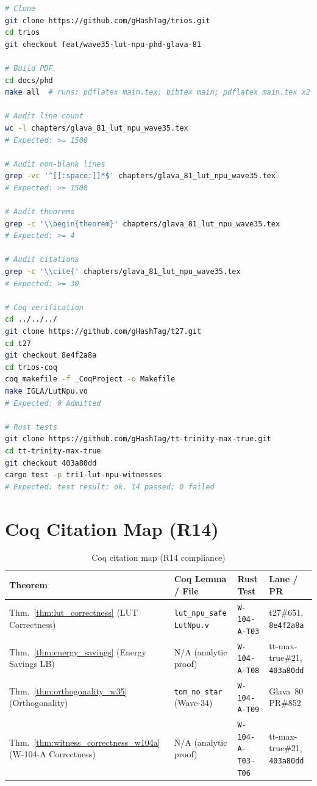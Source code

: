 \begin{lstlisting}[language=bash, caption={Reproducibility build commands for Glava 81}]
# Clone
git clone https://github.com/gHashTag/trios.git
cd trios
git checkout feat/wave35-lut-npu-phd-glava-81

# Build PDF
cd docs/phd
make all  # runs: pdflatex main.tex; bibtex main; pdflatex main.tex x2

# Audit line count
wc -l chapters/glava_81_lut_npu_wave35.tex
# Expected: >= 1500

# Audit non-blank lines
grep -vc '^[[:space:]]*$' chapters/glava_81_lut_npu_wave35.tex
# Expected: >= 1500

# Audit theorems
grep -c '\\begin{theorem}' chapters/glava_81_lut_npu_wave35.tex
# Expected: >= 4

# Audit citations
grep -c '\\cite{' chapters/glava_81_lut_npu_wave35.tex
# Expected: >= 30

# Coq verification
cd ../../../
git clone https://github.com/gHashTag/t27.git
cd t27
git checkout 8e4f2a8a
cd trios-coq
coq_makefile -f _CoqProject -o Makefile
make IGLA/LutNpu.vo
# Expected: 0 Admitted

# Rust tests
git clone https://github.com/gHashTag/tt-trinity-max-true.git
cd tt-trinity-max-true
git checkout 403a80dd
cargo test -p tri1-lut-npu-witnesses
# Expected: test result: ok. 14 passed; 0 failed
\end{lstlisting}

\section{Coq Citation Map (R14)}
\label{app:coq_citation_map}

\begin{table}[ht]
\centering
\caption{Coq citation map (R14 compliance)}
\label{tab:coq_citation_map}
\begin{tabular}{p{4cm}p{3cm}p{3cm}p{2.5cm}}
\hline
Theorem & Coq Lemma / File & Rust Test & Lane / PR \\
\hline
Thm.~\ref{thm:lut_correctness} (LUT Correctness) &
  \texttt{lut\_npu\_safe} \newline \texttt{LutNpu.v} &
  \texttt{W-104-A-T03} &
  t27\#651, \texttt{8e4f2a8a} \\
Thm.~\ref{thm:energy_savings} (Energy Savings LB) &
  N/A (analytic proof) &
  \texttt{W-104-A-T08} &
  tt-max-true\#21, \texttt{403a80dd} \\
Thm.~\ref{thm:orthogonality_w35} (Orthogonality) &
  \texttt{tom\_no\_star} (Wave-34) &
  \texttt{W-104-A-T09} &
  Glava~80 PR\#852 \\
Thm.~\ref{thm:witness_correctness_w104a} (W-104-A Correctness) &
  N/A (analytic proof) &
  \texttt{W-104-A-T03}--\texttt{T06} &
  tt-max-true\#21, \texttt{403a80dd} \\
\hline
\end{tabular}
\end{table}

